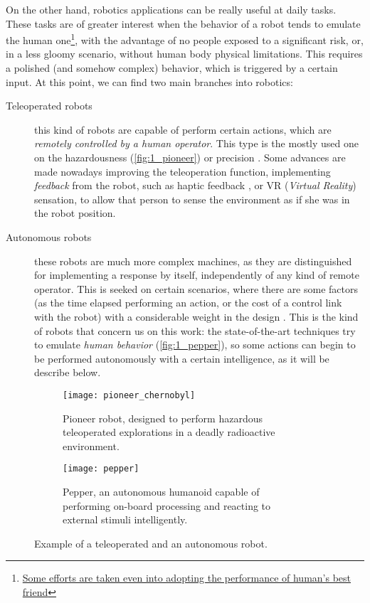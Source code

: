 On the other hand, robotics applications can be really useful at daily tasks. These tasks are of greater interest when the behavior of a robot tends to emulate the human one\footnote{\href{https://www.engadget.com/2018/01/08/new-sony-aibo-first-impressions/}{Some efforts are taken even into adopting the performance of human's best friend}}, with the advantage of no people exposed to a significant risk, or, in a less gloomy scenario, without human body physical limitations. This requires a polished (and somehow complex) behavior, which is triggered by a certain input. At this point, we can find two main branches into robotics:
\begin{description}
	\item [Teleoperated robots] this kind of robots are capable of perform certain actions, which are \textit{remotely controlled by a human operator}. This type is the mostly used one on the hazardousness (\autoref{fig:1_pioneer}) \cite{chernobyl-robot} or precision \cite{teleop-surgery}. Some advances are made nowadays improving the teleoperation function, implementing \textit{feedback} from the robot, such as haptic feedback \cite{teleop-haptic}, or VR (\emph{Virtual Reality}) sensation, to allow that person to sense the environment as if she was in the robot position.
	
	\item [Autonomous robots] these robots are much more complex machines, as they are distinguished for implementing a response by itself, independently of any kind of remote operator. This is seeked on certain scenarios, where there are some factors (as the time elapsed performing an action, or the cost of a control link with the robot) with a considerable weight in the design \cite{ai-space}. This is the kind of robots that concern us on this work: the state-of-the-art techniques try to emulate \textit{human behavior} (\autoref{fig:1_pepper}), so some actions can begin to be performed autonomously with a certain intelligence, as it will be describe below.
\end{description}


\begin{figure}[h]
	\centering
	\begin{subfigure}[t]{0.45\textwidth}
		\centering
		\texttt{[image: pioneer\_chernobyl]}
		\caption{Pioneer robot, designed to perform hazardous teleoperated explorations in a deadly radioactive environment.}
		\label{fig:1_pioneer}
	\end{subfigure}
	\hfill
	\begin{subfigure}[t]{0.4\textwidth}
		\centering
		\texttt{[image: pepper]}
		\caption{Pepper, an autonomous humanoid capable of performing on-board processing and reacting to external stimuli intelligently.}
		\label{fig:1_pepper}
	\end{subfigure}
	\caption{Example of a teleoperated and an autonomous robot.}
	\label{fig:1_robots}
\end{figure}

